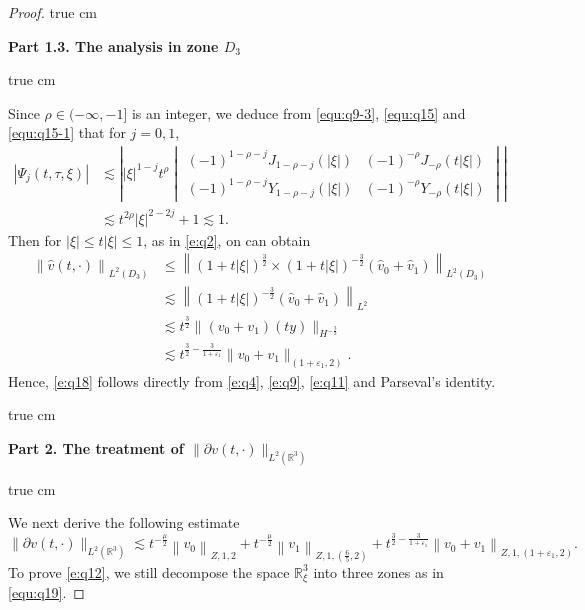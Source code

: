 \documentclass[11pt,twoside]{article}
\newcommand{\R}{\mathbb R}
\newcommand{\p}{\partial}
\newcommand{\f}{\frac}
\theoremstyle{plain}
\theoremstyle{definition}
\theoremstyle{remark}
\numberwithin{equation}{section}
\begin{document}
\begin{proof}
 true cm

{\bf Part 1.3.  The analysis  in zone $D_3$}

 true cm

Since $\rho\in(-\infty,-1]$ is an integer, we deduce from \eqref{equ:q9-3}, \eqref{equ:q15} and \eqref{equ:q15-1} that for $j=0,1$,
\begin{equation}\label{e:q10}
\begin{aligned}
|\Psi_j(t,\tau,\xi)|
&\lesssim\left| |\xi|^{1-j} t^{\rho}
\begin{vmatrix}
(-1)^{1-\rho-j}J_{1-\rho-j}(|\xi|) & (-1)^{-\rho}J_{-\rho}(t|\xi|) \\
(-1)^{1-\rho-j}Y_{1-\rho-j}(|\xi|) & (-1)^{-\rho}Y_{-\rho}(t|\xi|)
\end{vmatrix} \right|\\
&\lesssim t^{2\rho}|\xi|^{2-2j}+1
\lesssim 1.
\end{aligned}
\end{equation}
Then for $|\xi|\leq t|\xi| \leq 1$, as in \eqref{e:q2}, on can obtain
\begin{equation}\label{e:q11}
\begin{aligned}
\left\|\hat{v}(t, \cdot)\right\|_{L^2(D_3)} & \leq\left\|(1+t|\xi|)^{\f32}\times(1+t|\xi|)^{-\f32}(\hat{v}_{0}+\hat{v}_{1})\right\|_{L^{2}(D_3)} \\
&\lesssim\left\|(1+t|\xi|)^{-\f32}(\hat{v}_{0}+\hat{v}_{1})\right\|_{L^{2}}\\
& \lesssim t^{\f32}\|(v_0+v_1)(ty)\|_{H^{-\f32}}\\
&\lesssim t^{\f32-\f{3}{1+\varepsilon_1}}\|v_0+v_1\|_{(1+\varepsilon_1, 2)}.
\end{aligned}
\end{equation}
Hence, \eqref{e:q18} follows directly from \eqref{e:q4}, \eqref{e:q9}, \eqref{e:q11} and Parseval's identity.

 true cm

{\bf Part 2.  The treatment  of $\|\p v(t, \cdot)\|_{L^2(\R^3)}$ }

 true cm

We next derive the following estimate
\begin{equation}\label{e:q12}
\|\p v(t, \cdot)\|_{L^2(\R^3)} \lesssim t^{-\f{\mu}{2}}\left\|v_0\right\|_{Z, 1, 2}+t^{-\f{\mu}{2}}\left\|v_1\right\|_{Z, 1,(\f65, 2)}+t^{\f32-\f{3}{1+\varepsilon_1}}\left\|v_0+v_1\right\|_{Z, 1,(1+\varepsilon_1, 2)}.
\end{equation}
To prove \eqref{e:q12}, we still
decompose the space $\R_{\xi}^3$ into three zones as in \eqref{equ:q19}.


\end{proof}
\end{document}
